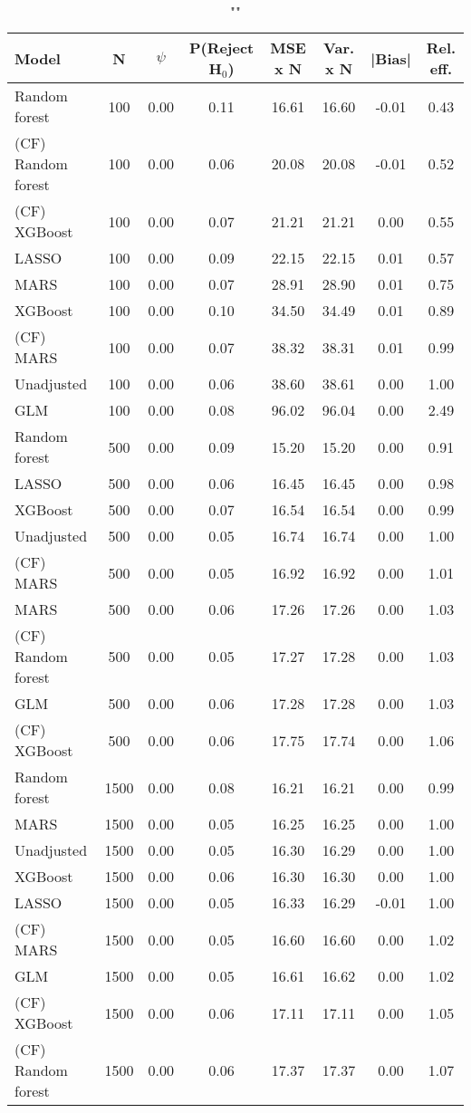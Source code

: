 \begin{table}
\centering
\caption{""}
\begin{tabular}{lccccccc}
\toprule
Model & N & $\psi$ & P(Reject H$_0$) & MSE x N & Var. x N & |Bias| & Rel. eff.\\ \midrule
Random forest & 100 & 0.00 & 0.11 & 16.61 & 16.60 & -0.01 & 0.43 \\ 
(CF) Random forest & 100 & 0.00 & 0.06 & 20.08 & 20.08 & -0.01 & 0.52 \\ 
(CF) XGBoost & 100 & 0.00 & 0.07 & 21.21 & 21.21 &  0.00 & 0.55 \\ 
LASSO & 100 & 0.00 & 0.09 & 22.15 & 22.15 &  0.01 & 0.57 \\ 
MARS & 100 & 0.00 & 0.07 & 28.91 & 28.90 &  0.01 & 0.75 \\ 
XGBoost & 100 & 0.00 & 0.10 & 34.50 & 34.49 &  0.01 & 0.89 \\ 
(CF) MARS & 100 & 0.00 & 0.07 & 38.32 & 38.31 &  0.01 & 0.99 \\ 
Unadjusted & 100 & 0.00 & 0.06 & 38.60 & 38.61 &  0.00 & 1.00 \\ 
GLM & 100 & 0.00 & 0.08 & 96.02 & 96.04 &  0.00 & 2.49 \\ \addlinespace 
Random forest & 500 & 0.00 & 0.09 & 15.20 & 15.20 &  0.00 & 0.91 \\ 
LASSO & 500 & 0.00 & 0.06 & 16.45 & 16.45 &  0.00 & 0.98 \\ 
XGBoost & 500 & 0.00 & 0.07 & 16.54 & 16.54 &  0.00 & 0.99 \\ 
Unadjusted & 500 & 0.00 & 0.05 & 16.74 & 16.74 &  0.00 & 1.00 \\ 
(CF) MARS & 500 & 0.00 & 0.05 & 16.92 & 16.92 &  0.00 & 1.01 \\ 
MARS & 500 & 0.00 & 0.06 & 17.26 & 17.26 &  0.00 & 1.03 \\ 
(CF) Random forest & 500 & 0.00 & 0.05 & 17.27 & 17.28 &  0.00 & 1.03 \\ 
GLM & 500 & 0.00 & 0.06 & 17.28 & 17.28 &  0.00 & 1.03 \\ 
(CF) XGBoost & 500 & 0.00 & 0.06 & 17.75 & 17.74 &  0.00 & 1.06 \\ \addlinespace 
Random forest & 1500 & 0.00 & 0.08 & 16.21 & 16.21 &  0.00 & 0.99 \\ 
MARS & 1500 & 0.00 & 0.05 & 16.25 & 16.25 &  0.00 & 1.00 \\ 
Unadjusted & 1500 & 0.00 & 0.05 & 16.30 & 16.29 &  0.00 & 1.00 \\ 
XGBoost & 1500 & 0.00 & 0.06 & 16.30 & 16.30 &  0.00 & 1.00 \\ 
LASSO & 1500 & 0.00 & 0.05 & 16.33 & 16.29 & -0.01 & 1.00 \\ 
(CF) MARS & 1500 & 0.00 & 0.05 & 16.60 & 16.60 &  0.00 & 1.02 \\ 
GLM & 1500 & 0.00 & 0.05 & 16.61 & 16.62 &  0.00 & 1.02 \\ 
(CF) XGBoost & 1500 & 0.00 & 0.06 & 17.11 & 17.11 &  0.00 & 1.05 \\ 
(CF) Random forest & 1500 & 0.00 & 0.06 & 17.37 & 17.37 &  0.00 & 1.07 \\
\bottomrule
\end{tabular}
\end{table}

